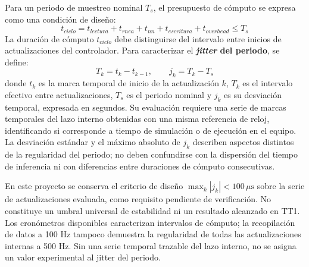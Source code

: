 \documentclass[12pt]{article}
\begin{document}
Para un periodo de muestreo nominal $T_s$, el presupuesto de cómputo se expresa como una condición de diseño:
\begin{equation}
t_{ciclo} = t_{lectura} + t_{rnea} + t_{nn} + t_{escritura} + t_{overhead} \le T_s
\label{eq:timing_budget}
\end{equation}
La duración de cómputo $t_{ciclo}$ debe distinguirse del intervalo entre inicios de actualizaciones del controlador. Para caracterizar el \textbf{\textit{jitter} del periodo}, se define:
\begin{equation}
    T_k = t_k - t_{k-1}, \qquad j_k = T_k - T_s
    \label{eq:jitter_periodo}
\end{equation}
donde $t_k$ es la marca temporal de inicio de la actualización $k$, $T_k$ es el intervalo efectivo entre actualizaciones, $T_s$ es el periodo nominal y $j_k$ es su desviación temporal, expresada en segundos. Su evaluación requiere una serie de marcas temporales del lazo interno obtenidas con una misma referencia de reloj, identificando si corresponde a tiempo de simulación o de ejecución en el equipo. La desviación estándar y el máximo absoluto de $j_k$ describen aspectos distintos de la regularidad del periodo; no deben confundirse con la dispersión del tiempo de inferencia ni con diferencias entre duraciones de cómputo consecutivas.

En este proyecto se conserva el criterio de diseño $\max_k |j_k| < 100\,\mu\text{s}$ sobre la serie de actualizaciones evaluada, como requisito pendiente de verificación. No constituye un umbral universal de estabilidad ni un resultado alcanzado en TT1. Los cronómetros disponibles caracterizan intervalos de cómputo; la recopilación de datos a 100 Hz tampoco demuestra la regularidad de todas las actualizaciones internas a 500 Hz. Sin una serie temporal trazable del lazo interno, no se asigna un valor experimental al jitter del periodo.
\end{document}
